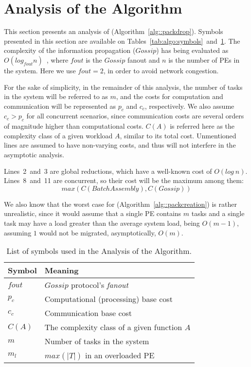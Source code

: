 \section{Analysis of the Algorithm} \label{sec:analysis}

This section presents an analysis of \packdrop (Algorithm~\ref{alg::packdrop}). 
Symbols presented in this section are available on Tables~\ref{tab:algo:symbols}~and~\ref{tab:analysis:symbols}.
The complexity of the information propagation ($Gossip$) has being evaluated as $O(log_{fout}n)$~\cite{grapevine},
where $fout$ is the $Gossip$ fanout and $n$ is the number of PEs in the system.
Here we use $fout=2$, in order to avoid network congestion. 

For the sake of simplicity, in the remainder of this analysis, the number of tasks in the system
will be referred to as $m$, and the costs for computation and communication will be represented as $p_c$ and $c_c$, respectively.
We also assume $c_c > p_c$ for all concurrent scenarios, since communication costs are several orders of magnitude higher than computational costs.
$C(A)$ is referred here as the complexity class of a given workload $A$, similar to its total cost.
Unmentioned lines are assumed to have non-varying costs, and thus will not interfere in the asymptotic analysis.

Lines~2~and~3 are global reductions, which have a well-known cost of $O(log\ n)$.
Lines~8~and~11 are concurrent, so their cost will be the maximum among them:
\begin{equation}
  max(C(BatchAssembly),C(Gossip))
\end{equation}

We also know that the worst case for \batchassembly (Algorithm~\ref{alg::packcreation}) is rather unrealistic, 
since it would assume that a single PE contains $m$ tasks and a single task may have a load greater than the average system load, being $O(m-1)$, assuming $1$ would not be migrated, asymptotically, $O(m)$.

\begin{table}[t]
	\caption{List of symbols used in the Analysis of the Algorithm.}
	\centering	
	\begin{tabular}{l l}
		\toprule
		\textbf{Symbol}		& \textbf{Meaning} \\
		\midrule
		$fout$			& $Gossip$ protocol's \textit{fanout} \\ 
		$p_c$			& Computational (processing) base cost \\
		$c_c$			& Communication base cost \\
		$C(A)$			& The complexity class of a given function $A$ \\
		$m$				& Number of tasks in the system \\
		$m_l$			& $max(|T|)$ in an overloaded PE \\
		\bottomrule
	\end{tabular}
	\label{tab:analysis:symbols}
\end{table}

